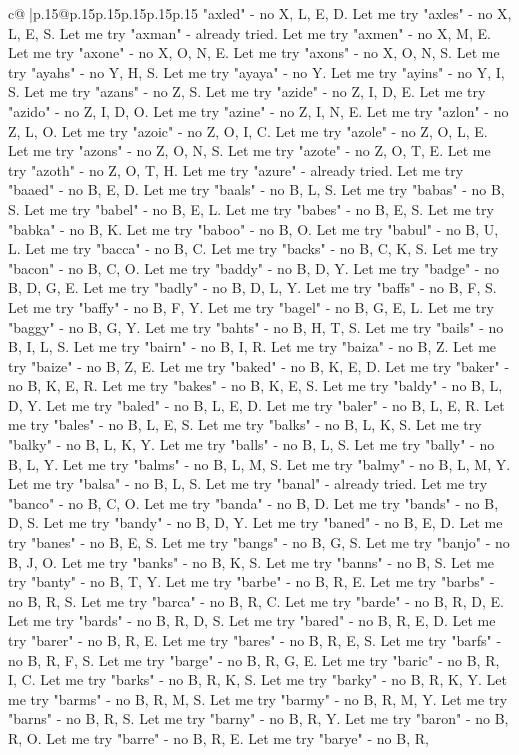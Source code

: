 \documentclass{article}
\begin{document}
{\begin{supertabular}{c@{$\;$}|p{.15\linewidth}@{}p{.15\linewidth}p{.15\linewidth}p{.15\linewidth}p{.15\linewidth}p{.15\linewidth}}
{{{"axled" {-} no X, L, E, D. Let me try "axles" {-} no X, L, E, S. Let me try "axman" {-} already tried. Let me try "axmen" {-} no X, M, E. Let me try "axone" {-} no X, O, N, E. Let me try "axons" {-} no X, O, N, S. Let me try "ayahs" {-} no Y, H, S. Let me try "ayaya" {-} no Y. Let me try "ayins" {-} no Y, I, S. Let me try "azans" {-} no Z, S. Let me try "azide" {-} no Z, I, D, E. Let me try "azido" {-} no Z, I, D, O. Let me try "azine" {-} no Z, I, N, E. Let me try "azlon" {-} no Z, L, O. Let me try "azoic" {-} no Z, O, I, C. Let me try "azole" {-} no Z, O, L, E. Let me try "azons" {-} no Z, O, N, S. Let me try "azote" {-} no Z, O, T, E. Let me try "azoth" {-} no Z, O, T, H. Let me try "azure" {-} already tried. Let me try "baaed" {-} no B, E, D. Let me try "baals" {-} no B, L, S. Let me try "babas" {-} no B, S. Let me try "babel" {-} no B, E, L. Let me try "babes" {-} no B, E, S. Let me try "babka" {-} no B, K. Let me try "baboo" {-} no B, O. Let me try "babul" {-} no B, U, L. Let me try "bacca" {-} no B, C. Let me try "backs" {-} no B, C, K, S. Let me try "bacon" {-} no B, C, O. Let me try "baddy" {-} no B, D, Y. Let me try "badge" {-} no B, D, G, E. Let me try "badly" {-} no B, D, L, Y. Let me try "baffs" {-} no B, F, S. Let me try "baffy" {-} no B, F, Y. Let me try "bagel" {-} no B, G, E, L. Let me try "baggy" {-} no B, G, Y. Let me try "bahts" {-} no B, H, T, S. Let me try "bails" {-} no B, I, L, S. Let me try "bairn" {-} no B, I, R. Let me try "baiza" {-} no B, Z. Let me try "baize" {-} no B, Z, E. Let me try "baked" {-} no B, K, E, D. Let me try "baker" {-} no B, K, E, R. Let me try "bakes" {-} no B, K, E, S. Let me try "baldy" {-} no B, L, D, Y. Let me try "baled" {-} no B, L, E, D. Let me try "baler" {-} no B, L, E, R. Let me try "bales" {-} no B, L, E, S. Let me try "balks" {-} no B, L, K, S. Let me try "balky" {-} no B, L, K, Y. Let me try "balls" {-} no B, L, S. Let me try "bally" {-} no B, L, Y. Let me try "balms" {-} no B, L, M, S. Let me try "balmy" {-} no B, L, M, Y. Let me try "balsa" {-} no B, L, S. Let me try "banal" {-} already tried. Let me try "banco" {-} no B, C, O. Let me try "banda" {-} no B, D. Let me try "bands" {-} no B, D, S. Let me try "bandy" {-} no B, D, Y. Let me try "baned" {-} no B, E, D. Let me try "banes" {-} no B, E, S. Let me try "bangs" {-} no B, G, S. Let me try "banjo" {-} no B, J, O. Let me try "banks" {-} no B, K, S. Let me try "banns" {-} no B, S. Let me try "banty" {-} no B, T, Y. Let me try "barbe" {-} no B, R, E. Let me try "barbs" {-} no B, R, S. Let me try "barca" {-} no B, R, C. Let me try "barde" {-} no B, R, D, E. Let me try "bards" {-} no B, R, D, S. Let me try "bared" {-} no B, R, E, D. Let me try "barer" {-} no B, R, E. Let me try "bares" {-} no B, R, E, S. Let me try "barfs" {-} no B, R, F, S. Let me try "barge" {-} no B, R, G, E. Let me try "baric" {-} no B, R, I, C. Let me try "barks" {-} no B, R, K, S. Let me try "barky" {-} no B, R, K, Y. Let me try "barms" {-} no B, R, M, S. Let me try "barmy" {-} no B, R, M, Y. Let me try "barns" {-} no B, R, S. Let me try "barny" {-} no B, R, Y. Let me try "baron" {-} no B, R, O. Let me try "barre" {-} no B, R, E. Let me try "barye" {-} no B, R, }}}
\end{supertabular}}
\end{document}
